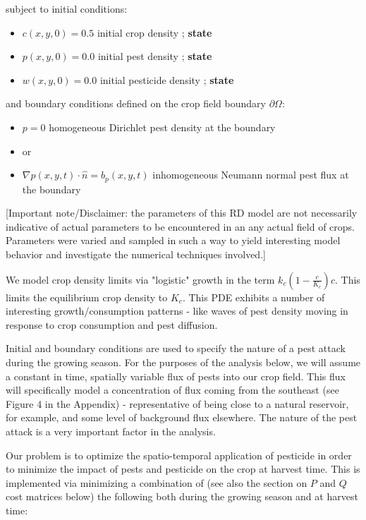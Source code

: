 \documentclass[11pt]{article}
\begin{document}
subject to initial conditions:

\begin{itemize}
\setlength\itemsep{-1pt}
\item $c(x,y,0) = 0.5$ initial crop density ; \textbf{state}
\item $p(x,y,0) = 0.0$ initial pest density ; \textbf{state}
\item $w(x,y,0) = 0.0$ initial pesticide density ; \textbf{state}
\end{itemize}

and boundary conditions defined on the crop field boundary $\partial\Omega$:

\begin{itemize}
\setlength\itemsep{-1pt}
\item $p = 0$ homogeneous Dirichlet pest density at the boundary
\item or
\item $\nabla p(x,y,t) \cdot \hat{n} = b_p(x,y,t)$ inhomogeneous Neumann normal pest flux at the boundary
\end{itemize}

[Important note/Disclaimer: the parameters of this RD model are not necessarily indicative of actual parameters to be encountered in an any actual field of crops. Parameters were varied and sampled in such a way to yield interesting model behavior and investigate the numerical techniques involved.]

We model crop density limits via "logistic" growth in the term $k_c \left( 1 - \frac{c}{K_c} \right) c$. This limits the equilibrium crop density to $K_c$. This PDE exhibits a number of interesting growth/consumption patterns - like waves of pest density moving in response to crop consumption and pest diffusion.

Initial and boundary conditions are used to specify the nature of a pest attack during the growing season. For the purposes of the analysis below, we will assume a constant in time, spatially variable flux of pests into our crop field. This flux will specifically model a concentration of flux coming from the southeast (see Figure 4 in the Appendix) - representative of being close to a natural reservoir, for example, and some level of background flux elsewhere. The nature of the pest attack is a very important factor in the analysis.

Our problem is to optimize the spatio-temporal application of pesticide in order to minimize the impact of pests and pesticide on the crop at harvest time. This is implemented via minimizing a combination of (see also the section on $P$ and $Q$ cost matrices below) the following both during the growing season and at harvest time:
\end{document}
